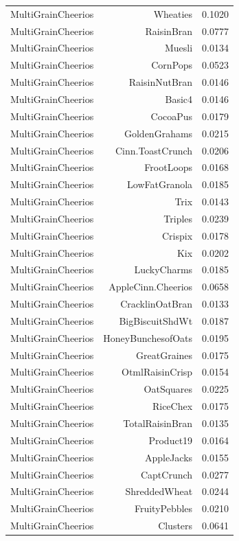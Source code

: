 \begin{longtable}{@{}lrr@{}}
MultiGrainCheerios & Wheaties & 0.1020 \\
MultiGrainCheerios & RaisinBran & 0.0777 \\
MultiGrainCheerios & Muesli & 0.0134 \\
MultiGrainCheerios & CornPops & 0.0523 \\
MultiGrainCheerios & RaisinNutBran & 0.0146 \\
MultiGrainCheerios & Basic4 & 0.0146 \\
MultiGrainCheerios & CocoaPus & 0.0179 \\
MultiGrainCheerios & GoldenGrahams & 0.0215 \\
MultiGrainCheerios & Cinn.ToastCrunch & 0.0206 \\
MultiGrainCheerios & FrootLoops & 0.0168 \\
MultiGrainCheerios & LowFatGranola & 0.0185 \\
MultiGrainCheerios & Trix & 0.0143 \\
MultiGrainCheerios & Triples & 0.0239 \\
MultiGrainCheerios & Crispix & 0.0178 \\
MultiGrainCheerios & Kix & 0.0202 \\
MultiGrainCheerios & LuckyCharms & 0.0185 \\
MultiGrainCheerios & AppleCinn.Cheerios & 0.0658 \\
MultiGrainCheerios & CracklinOatBran & 0.0133 \\
MultiGrainCheerios & BigBiscuitShdWt & 0.0187 \\
MultiGrainCheerios & HoneyBunchesofOats & 0.0195 \\
MultiGrainCheerios & GreatGraines & 0.0175 \\
MultiGrainCheerios & OtmlRaisinCrisp & 0.0154 \\
MultiGrainCheerios & OatSquares & 0.0225 \\
MultiGrainCheerios & RiceChex & 0.0175 \\
MultiGrainCheerios & TotalRaisinBran & 0.0135 \\
MultiGrainCheerios & Product19 & 0.0164 \\
MultiGrainCheerios & AppleJacks & 0.0155 \\
MultiGrainCheerios & CaptCrunch & 0.0277 \\
MultiGrainCheerios & ShreddedWheat & 0.0244 \\
MultiGrainCheerios & FruityPebbles & 0.0210 \\
MultiGrainCheerios & Clusters & 0.0641 \\

\end{longtable}

